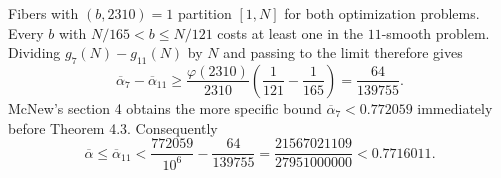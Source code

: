 Fibers with $(b,2310)=1$ partition $[1,N]$ for both optimization
problems. Every $b$ with $N/165<b\le N/121$ costs at least one in the
$11$-smooth problem. Dividing $g_7(N)-g_{11}(N)$ by $N$ and passing
to the limit therefore gives
\[
 \overline\alpha_7-\overline\alpha_{11}
 \ge \frac{\varphi(2310)}{2310}
       \left(\frac1{121}-\frac1{165}\right)=\frac{64}{139755}.
\]
McNew's section 4 obtains the more specific bound
$\overline\alpha_7<0.772059$ immediately before Theorem 4.3.
Consequently
\[
 \overline\alpha\le \overline\alpha_{11}
 < \frac{772059}{10^6}-\frac{64}{139755}
 =\frac{21567021109}{27951000000}<0.7716011.
\]
